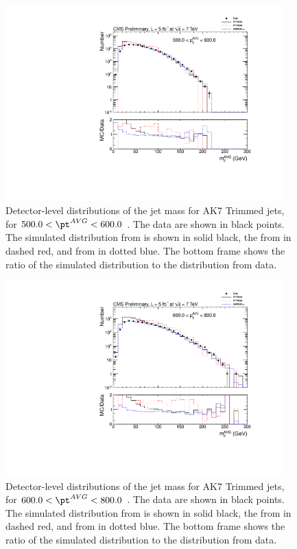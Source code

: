 \begin{figure}[htbp]
\centering
\includegraphics[width=0.95\textwidth]{figs/histAK7MjetVsPtAvg_rawDataMCComparisons_pt_7_Trimmed}
\caption{Detector-level distributions of the jet mass for AK7 Trimmed jets,
for $500.0 < \pt^{AVG} < 600.0$ \GeVc. The data are shown in black points.
The simulated distribution from \PYTHIA is shown in solid black, 
the from \PYTHIAEIGHT in dashed red, and from \HERWIG in dotted blue. 
The bottom frame shows the ratio of the simulated distribution
to the distribution from data. 
\label{figs:histAK7MjetVsPtAvg_rawDataMCComparisons_pt_7_Trimmed}}
\end{figure}



\begin{figure}[htbp]
\centering
\includegraphics[width=0.95\textwidth]{figs/histAK7MjetVsPtAvg_rawDataMCComparisons_pt_8_Trimmed}
\caption{Detector-level distributions of the jet mass for AK7 Trimmed jets,
for $600.0 < \pt^{AVG} < 800.0$ \GeVc. The data are shown in black points.
The simulated distribution from \PYTHIA is shown in solid black, 
the from \PYTHIAEIGHT in dashed red, and from \HERWIG in dotted blue. 
The bottom frame shows the ratio of the simulated distribution
to the distribution from data. 
\label{figs:histAK7MjetVsPtAvg_rawDataMCComparisons_pt_8_Trimmed}}
\end{figure}



